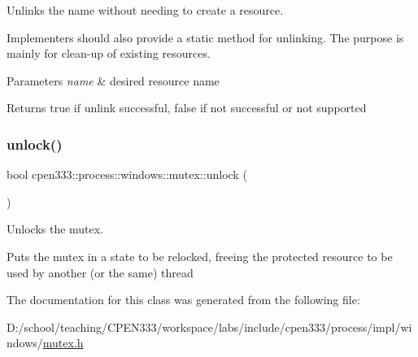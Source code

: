 Unlinks the name without needing to create a resource. 

Implementers should also provide a static method for unlinking. The purpose is mainly for clean-\/up of existing resources.


\begin{DoxyParams}{Parameters}
{\em name} & desired resource name \\
\hline
\end{DoxyParams}
\begin{DoxyReturn}{Returns}
{\ttfamily true} if unlink successful, {\ttfamily false} if not successful or not supported 
\end{DoxyReturn}
\mbox{\label{classcpen333_1_1process_1_1windows_1_1mutex_a998f0f3d2e56d3acf63a30b465e153a7}} 
\subsubsection{\texorpdfstring{unlock()}{unlock()}}
{\footnotesize\ttfamily bool cpen333\+::process\+::windows\+::mutex\+::unlock (\begin{DoxyParamCaption}{ }\end{DoxyParamCaption})\hspace{0.3cm}{\ttfamily [inline]}}



Unlocks the mutex. 

Puts the mutex in a state to be relocked, freeing the protected resource to be used by another (or the same) thread 

The documentation for this class was generated from the following file\+:\begin{DoxyCompactItemize}
\item 
D\+:/school/teaching/\+C\+P\+E\+N333/workspace/labs/include/cpen333/process/impl/windows/\hyperlink{impl_2windows_2mutex_8h}{mutex.\+h}\end{DoxyCompactItemize}
